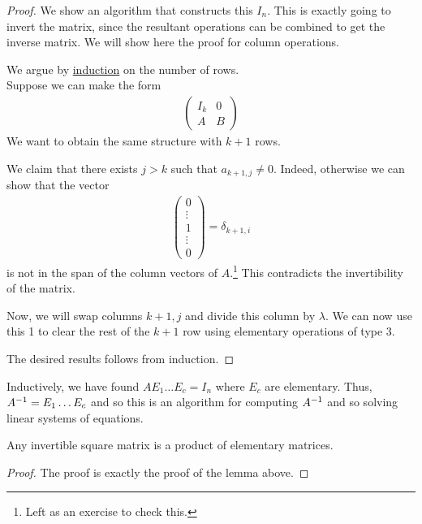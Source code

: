 \begin{proof}
    We show an algorithm that constructs this $I_n$.
    This is exactly going to invert the matrix, since the resultant operations can be combined to get the inverse matrix.
    We will show here the proof for column operations.

    We argue by \underline{induction} on the number of rows. \\
    Suppose we can make the form
    \begin{align*}
        \begin{pmatrix} I_k & 0 \\ A & B \end{pmatrix}
    \end{align*}
    We want to obtain the same structure with $k+1$ rows.

    We claim that there exists $j > k$ such that $a_{k+1,j} \neq 0$.
    Indeed, otherwise we can show that the vector
    \begin{align*}
        \begin{pmatrix} 0 \\ \vdots \\ 1 \\ \vdots \\ 0 \end{pmatrix} = \delta_{k+1,i}
    \end{align*}
    is not in the span of the column vectors of $A$.\footnote{Left as an exercise to check this.}
    This contradicts the invertibility of the matrix.

    Now, we will swap columns $k+1, j$ and divide this column by $\lambda$.
    We can now use this 1 to clear the rest of the $k+1$ row using elementary operations of type 3.

    The desired results follows from induction.
\end{proof}

\begin{remark}
    Inductively, we have found $A E_1 \dots E_c = I_n$ where $E_c$ are elementary.
    Thus, $A^{-1} = E_1 \dots E_c$ and so this is an algorithm for computing $A^{-1}$ and so solving linear systems of equations.
\end{remark} 

\begin{proposition}
    Any invertible square matrix is a product of elementary matrices.
\end{proposition}

\begin{proof}
    The proof is exactly the proof of the lemma above.
\end{proof}